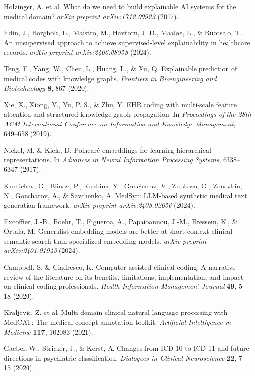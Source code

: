 \documentclass[12pt,a4paper]{report}
\begin{document}
\begin{thebibliography}{99}
Holzinger, A. et al. What do we need to build explainable AI systems for the medical domain? \textit{arXiv preprint arXiv:1712.09923} (2017).

Edin, J., Borgholt, L., Maistro, M., Havtorn, J. D., Maaløe, L., \& Ruotsalo, T. An unsupervised approach to achieve supervised-level explainability in healthcare records. \textit{arXiv preprint arXiv:2406.08958} (2024).

Teng, F., Yang, W., Chen, L., Huang, L., \& Xu, Q. Explainable prediction of medical codes with knowledge graphs. \textit{Frontiers in Bioengineering and Biotechnology} \textbf{8}, 867 (2020).

Xie, X., Xiong, Y., Yu, P. S., \& Zhu, Y. EHR coding with multi-scale feature attention and structured knowledge graph propagation. In \textit{Proceedings of the 28th ACM International Conference on Information and Knowledge Management}, 649–658 (2019).

Nickel, M. \& Kiela, D. Poincaré embeddings for learning hierarchical representations. In \textit{Advances in Neural Information Processing Systems}, 6338–6347 (2017).

Kumichev, G., Blinov, P., Kuzkina, Y., Goncharov, V., Zubkova, G., Zenovkin, N., Goncharov, A., \& Savchenko, A. MedSyn: LLM-based synthetic medical text generation framework. \textit{arXiv preprint arXiv:2408.02056} (2024).

Excoffier, J.-B., Roehr, T., Figueroa, A., Papaioannou, J.-M., Bressem, K., \& Ortala, M. Generalist embedding models are better at short-context clinical semantic search than specialized embedding models. \textit{arXiv preprint arXiv:2401.01943} (2024).

Campbell, S. \& Giadresco, K. Computer-assisted clinical coding: A narrative review of the literature on its benefits, limitations, implementation, and impact on clinical coding professionals. \textit{Health Information Management Journal} \textbf{49}, 5–18 (2020).

Kraljevic, Z. et al. Multi-domain clinical natural language processing with MedCAT: The medical concept annotation toolkit. \textit{Artificial Intelligence in Medicine} \textbf{117}, 102083 (2021).

Gaebel, W., Stricker, J., \& Kerst, A. Changes from ICD-10 to ICD-11 and future directions in psychiatric classification. \textit{Dialogues in Clinical Neuroscience} \textbf{22}, 7–15 (2020).


\end{thebibliography}
\end{document}
